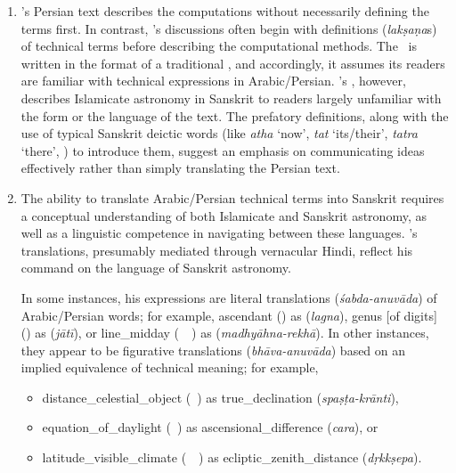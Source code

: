 \begin{enumerate}[topsep=0pt]
    \item \MullaFarid's Persian text describes the computations without necessarily defining the terms first. In contrast, \Nityananda's discussions often begin with definitions (\textit{lakṣaṇa}s) of technical terms before describing the computational methods.  
    The \ZijiShahJahani\ is written in the format of a traditional \zij, and accordingly, it assumes its readers are familiar with technical expressions in Arabic/Persian. \Nityananda's \Siddhantasindhu, however,  describes Islamicate astronomy in Sanskrit to readers largely unfamiliar with the form or the language of the text. The prefatory definitions, along with the use of typical Sanskrit deictic words (like \textit{atha} `now', \textit{tat} `its/their', \textit{tatra} `there', \etcp) to introduce them, suggest an emphasis on communicating ideas effectively rather than simply translating the Persian text.  
    \item The ability to translate Arabic/Persian technical terms into Sanskrit requires a conceptual understanding of both Islamicate and Sanskrit astronomy, as well as a linguistic competence in navigating between these languages. \Nityananda's translations, presumably mediated through vernacular Hindi, reflect his command on the language of Sanskrit astronomy.
    
    In some instances, his expressions are literal translations (\textit{śabda-anuvāda}) of Arabic/Persian words; for example, \gls{ascendant}  (\tali) as  (\textit{lagna}), 
    \gls{genus} [of digits]  (\jins) as  (\textit{jātī}),  or \gls{line_midday}  (\khatt\ \nisf\ \alnahar) as  (\textit{madhyāhna-rekhā}). In other instances, they appear to be figurative translations (\textit{bhāva-anuvāda}) based on an implied equivalence of technical meaning; for example,
    \begin{itemize}
    \item \gls{distance_celestial_object}  (\bud\idafaconsonant\ \kawakib) as \gls{true_declination}  (\textit{spaṣṭa-krānti}),
    \item \gls{equation_of_daylight}  (\tadil\ \alnahar) as \gls{ascensional_difference}  (\textit{cara}), or 
    \item \gls{latitude_visible_climate}  (\ard\idafaconsonant\ \iqlim\idafaconsonant\ \ruyat) as \gls{ecliptic_zenith_distance}  (\textit{dṛkkṣepa}). 


\end{itemize}
\end{enumerate}
